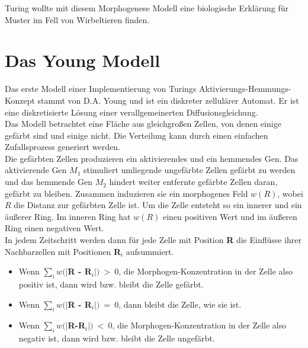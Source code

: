 \documentclass[]{article}
\begin{document}
Turing wollte mit diesem Morphogenese Modell eine biologische Erkl\"arung f\"ur Muster im Fell von Wirbeltieren finden.



\section{Das Young Modell}

Das erste Modell einer Implementierung von Turings Aktivierungs-Hemmungs-Konzept stammt von D.A. Young und ist ein diskreter zellul\"arer Automat. Er ist eine diskretisierte L\"osung einer verallgemeinerten Diffusionsgleichung. \\

Das Modell betrachtet eine Fl\"ache aus gleichgro\ss en Zellen, von denen einige gef\"arbt sind und einige nicht. Die Verteilung kann durch einen einfachen Zufallsprozess generiert werden. \\

Die gef\"arbten Zellen produzieren ein aktivierendes und ein hemmendes Gen. Das aktivierende Gen $M_1$ stimuliert umliegende ungef\"arbte Zellen gef\"arbt zu werden und das hemmende Gen $M_2$ hindert weiter entfernte gef\"arbte Zellen daran, gef\"arbt zu bleiben. 
Zusammen induzieren sie ein morphogenes Feld $w(R)$, wobei $R$ die Distanz zur gef\"arbten Zelle ist. Um die Zelle entsteht so ein innerer und ein \"au\ss erer Ring. Im inneren Ring hat $w(R)$ einen positiven Wert und im \"au\ss eren Ring einen negativen Wert. \\

In jedem Zeitschritt werden dann f\"ur jede Zelle mit Position \textbf{R} die Einfl\"usse ihrer Nachbarzellen mit Positionen \textbf{R$_i$} aufsummiert.

\begin{itemize}
	\item Wenn $\sum_{i} w (|$\textbf{R - R$_i$}$|)~>~0$, die Morphogen-Konzentration in der Zelle also positiv ist, dann wird bzw. bleibt die Zelle gef\"arbt. 
	
	\item Wenn $\sum_{i} w (|$\textbf{R - R$_i$}$|)~=~0$, dann bleibt die Zelle, wie sie ist. 
	
	\item Wenn $\sum_{i} w (|$\textbf{R-R$_i$}$|)~<~0$, die Morphogen-Konzentration in der Zelle also negativ ist, dann wird bzw. bleibt die Zelle ungef\"arbt. 
\end{itemize}
\end{document}
